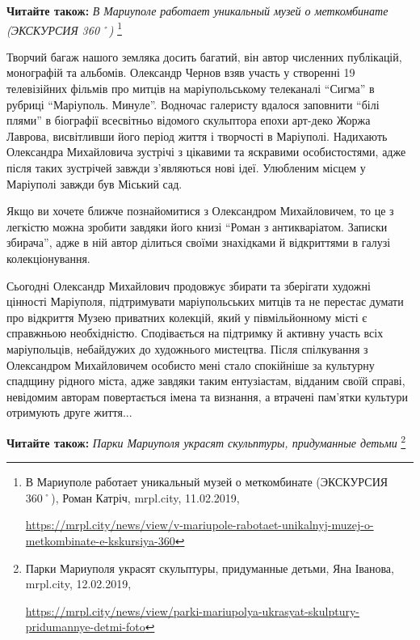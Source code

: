 \textbf{Читайте також:} \emph{В Мариуполе работает уникальный музей о меткомбинате (ЭКСКУРСИЯ 360˚)}%
\footnote{В Мариуполе работает уникальный музей о меткомбинате (ЭКСКУРСИЯ 360˚), Роман Катріч, mrpl.city, 11.02.2019, \par%
\url{https://mrpl.city/news/view/v-mariupole-rabotaet-unikalnyj-muzej-o-metkombinate-e-kskursiya-360}%
}

Творчий багаж нашого земляка досить багатий, він автор численних публікацій,
монографій та альбомів. Олександр Чернов взяв участь у створенні 19
телевізійних фільмів про митців на маріупольському телеканалі \enquote{Сигма} в рубриці
\enquote{Маріуполь. Минуле}. Водночас галеристу вдалося заповнити \enquote{білі плями} в
біографії всесвітньо відомого скульптора епохи арт-деко Жоржа Лаврова,
висвітливши його період життя і творчості в Маріуполі. Надихають Олександра
Михайловича зустрічі з цікавими та яскравими особистостями, адже після таких
зустрічей завжди з'являються нові ідеї. Улюбленим місцем у Маріуполі завжди був
Міський сад.


Якщо ви хочете ближче познайомитися з Олександром Михайловичем, то це з
легкістю можна зробити завдяки його книзі \enquote{Роман з антикваріатом. Записки
збирача}, адже в ній автор ділиться своїми знахідками й відкриттями в галузі
колекціонування.


Сьогодні Олександр Михайлович продовжує збирати та зберігати художні цінності
Маріуполя, підтримувати маріупольських митців та не перестає думати про
відкриття Музею приватних колекцій, який у півмільйонному місті є справжньою
необхідністю. Сподівається на підтримку й активну участь всіх маріупольців,
небайдужих до художнього мистецтва. Після спілкування з Олександром
Михайловичем особисто мені стало спокійніше за культурну спадщину рідного
міста, адже завдяки таким ентузіастам, відданим своїй справі, невідомим авторам
повертається імена та визнання, а втрачені пам'ятки культури отримують друге
життя...

\textbf{Читайте також:} \emph{Парки Мариуполя украсят скульптуры, придуманные детьми}%
\footnote{Парки Мариуполя украсят скульптуры, придуманные детьми, Яна Іванова, mrpl.city, 12.02.2019, \par%
\url{https://mrpl.city/news/view/parki-mariupolya-ukrasyat-skulptury-pridumannye-detmi-foto}
}

